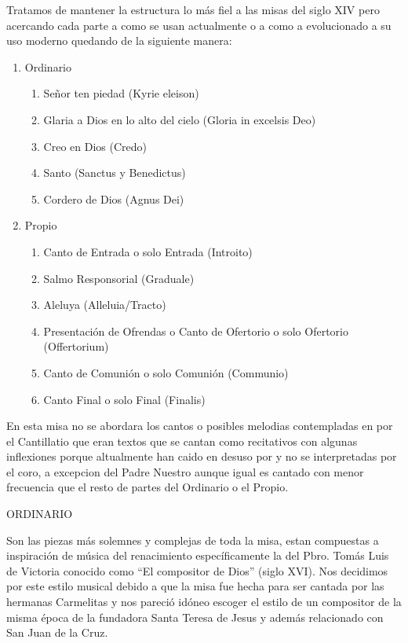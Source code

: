 \documentclass[12pt, letterpaper]{report}
\begin{document}
    Tratamos de mantener la estructura lo m\'as fiel a las misas del siglo XIV pero acercando cada parte a como se usan actualmente o a como a evolucionado a su uso moderno quedando de la siguiente manera:

    \renewcommand{\theenumi}{\arabic{enumi}}
    \begin{enumerate}
        \item Ordinario
        \begin{enumerate}
            \item Se\~nor ten piedad (Kyrie eleison)
            \item Glaria a Dios en lo alto del cielo (Gloria in excelsis Deo)
            \item Creo en Dios (Credo)
            \item Santo (Sanctus y Benedictus)
            \item Cordero de Dios (Agnus Dei)
        \end{enumerate}

        \item Propio
        \begin{enumerate}
            \item Canto de Entrada o solo Entrada (Introito)
            \item Salmo Responsorial (Graduale)
            \item Aleluya (Alleluia/Tracto)
            \item Presentaci\'on de Ofrendas o Canto de Ofertorio o solo Ofertorio (Offertorium)
            \item Canto de Comuni\'on o solo Comuni\'on (Communio)
            \item Canto Final o solo Final (Finalis)
        \end{enumerate}
    \end{enumerate}

    En esta misa no se abordara los cantos o posibles melodias contempladas en por el Cantillatio que eran textos que se cantan como recitativos con algunas inflexiones porque altualmente han caido en desuso por y no se interpretadas por el coro, a excepcion del Padre Nuestro aunque igual es cantado con menor frecuencia que el resto de partes del Ordinario o el Propio.

    \LARGE ORDINARIO

    \Large Son las piezas m\'as solemnes y complejas de toda la misa, estan compuestas a inspiraci\'on de m\'usica del renacimiento espec\'ificamente la del Pbro. Tom\'as Luis de Victoria conocido como ``El compositor de Dios'' (siglo XVI). Nos decidimos por este estilo musical debido a que la misa fue hecha para ser cantada por las hermanas Carmelitas y nos pareci\'o id\'oneo escoger el estilo de un compositor de la misma \'epoca de la fundadora Santa Teresa de Jesus y adem\'as relacionado con San Juan de la Cruz.
\end{document}
